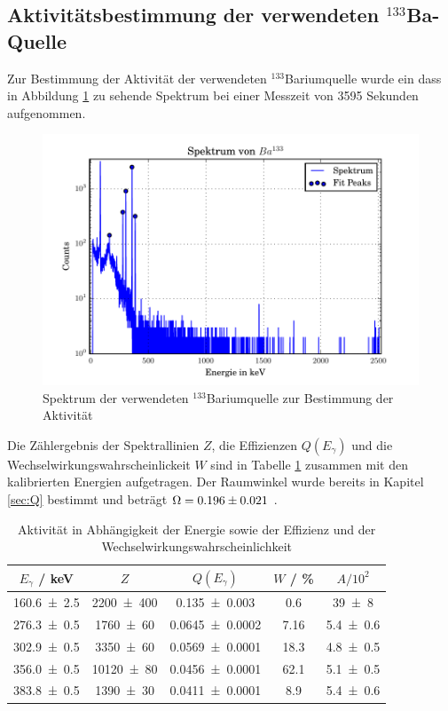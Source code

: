 \subsection{Aktivitätsbestimmung der verwendeten $^{133}$Ba-Quelle}
Zur Bestimmung der Aktivität der verwendeten $^{133}$Bariumquelle wurde ein dass in Abbildung \ref{fig:BA} zu sehende Spektrum bei einer Messzeit von 3595 Sekunden aufgenommen.
\begin{figure}[h]
  \centering
  \includegraphics[width=\textwidth]{./build/SpektBa.pdf}
  \caption{Spektrum der verwendeten $^{133}$Bariumquelle zur Bestimmung der Aktivität}
  \label{fig:BA}
\end{figure}
Die Zählergebnis der Spektrallinien $Z$, die Effizienzen $Q(E_\gamma)$ und die Wechselwirkungswahrscheinlickeit $W$ sind in Tabelle \ref{tab:Ba} zusammen mit den kalibrierten Energien aufgetragen. Der Raumwinkel wurde bereits in Kapitel \ref{sec:Q} bestimmt und beträgt $\Omega = \num{0.196 +- 0.021}$ .
\begin{table}
  \centering
  \caption{Aktivität in Abhängigkeit der Energie sowie der Effizienz und der Wechselwirkungswahrscheinlichkeit}
  \begin{tabular}{c c c c c}
    \toprule
	$E_\gamma$ / keV & $Z$ & $Q(E_\gamma)$ & $W$ / \%  & $A / 10^2$\\
    \hline
    \num{160.6 +- 2.5}	& \num{2200 +- 400}	& \num{0.135 +- 0.003} 		& 0.6	& \num{39 +- 8}	\\
    \num{276.3 +- 0.5}  & \num{1760 +- 60}	& \num{0.0645 +- 0.0002} 	& 7.16 	& \num{5.4 +- 0.6}	\\
    \num{302.9 +- 0.5}	& \num{3350 +- 60} 	& \num{0.0569 +- 0.0001} 	& 18.3	& \num{4.8 +- 0.5} 	\\
    \num{356.0 +- 0.5}	& \num{10120 +-	80}	& \num{0.0456 +- 0.0001} 	& 62.1	& \num{5.1 +-	0.5}	\\
    \num{383.8 +- 0.5}	& \num{1390 +- 30}	& \num{0.0411 +- 0.0001} 	& 8.9	& \num{5.4 +- 0.6}	\\
    \bottomrule
  \end{tabular}
  \label{tab:Ba}
\end{table}
